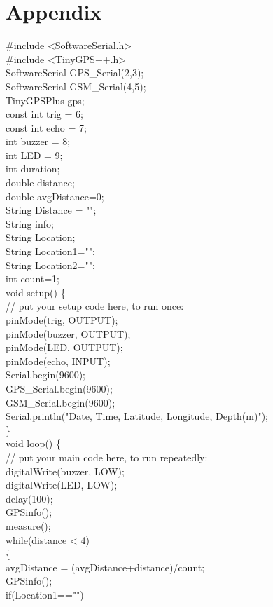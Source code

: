 \documentclass[12pt, top = 1 inch, bottom = 1 inch, left = 1.2 inch, top = .8 inch]{book}
\begin{document}
	\chapter{Appendix}
	\#include <SoftwareSerial.h>\\
	\#include <TinyGPS++.h>\\
	SoftwareSerial GPS\_Serial(2,3);\\
	SoftwareSerial GSM\_Serial(4,5);\\
	TinyGPSPlus gps;\\
	const int trig = 6;\\
	const int echo = 7;\\
	int buzzer = 8;\\
	int LED = 9;\\
	int duration;\\
	double distance;\\
	double avgDistance=0;\\
	String Distance = "";\\
	String info;\\
	String Location;\\
	String Location1="";\\
	String Location2="";\\
	int count=1;\\
	void setup() \{\\
		// put your setup code here, to run once:\\
		pinMode(trig, OUTPUT);\\
		pinMode(buzzer, OUTPUT);\\
		pinMode(LED, OUTPUT);\\
		pinMode(echo, INPUT);\\
		Serial.begin(9600);\\
		GPS\_Serial.begin(9600);\\
		GSM\_Serial.begin(9600);\\
		Serial.println("Date, Time, Latitude, Longitude, Depth(m)");\\
	\}\\
	
	void loop() \{\\
		// put your main code here, to run repeatedly:\\
		digitalWrite(buzzer, LOW);\\
		digitalWrite(LED, LOW);\\
		delay(100);\\
		GPSinfo();\\
		measure();\\
		while(distance < 4)\\
		\{ \\
			avgDistance = (avgDistance+distance)/count;\\
			GPSinfo();\\
			if(Location1=="")\\
			
\end{document}
